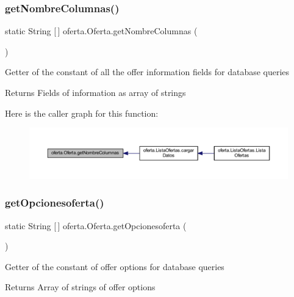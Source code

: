 \subsubsection{\texorpdfstring{get\+Nombre\+Columnas()}{getNombreColumnas()}}
{\footnotesize\ttfamily static String \mbox{[}$\,$\mbox{]} oferta.\+Oferta.\+get\+Nombre\+Columnas (\begin{DoxyParamCaption}{ }\end{DoxyParamCaption})\hspace{0.3cm}{\ttfamily [static]}}

Getter of the constant of all the offer information fields for database queries

\begin{DoxyReturn}{Returns}
Fields of information as array of strings 
\end{DoxyReturn}
Here is the caller graph for this function\+:
\nopagebreak
\begin{figure}[H]
\begin{center}
\leavevmode
\includegraphics[width=350pt]{classoferta_1_1_oferta_ab75e7ee84db370fdb8f5fcb4ea63e405_icgraph}
\end{center}
\end{figure}
\mbox{\label{classoferta_1_1_oferta_a7c159e3fdec5eedb27c557e82611a67e}} 
\subsubsection{\texorpdfstring{get\+Opcionesoferta()}{getOpcionesoferta()}}
{\footnotesize\ttfamily static String \mbox{[}$\,$\mbox{]} oferta.\+Oferta.\+get\+Opcionesoferta (\begin{DoxyParamCaption}{ }\end{DoxyParamCaption})\hspace{0.3cm}{\ttfamily [static]}}

Getter of the constant of offer options for database queries

\begin{DoxyReturn}{Returns}
Array of strings of offer options 
\end{DoxyReturn}
\mbox{\label{classoferta_1_1_oferta_a57a753a0bc4b862e6ea347320b25540e}} 
